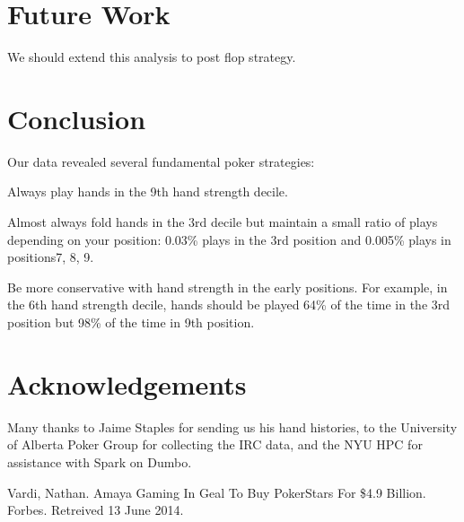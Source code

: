 \documentclass[twoside]{article}
\begin{document}
\begin{multicols}{2}

\section{Future Work}

We should extend this analysis to post flop strategy. 


\section{Conclusion}

Our data revealed several fundamental poker strategies:
\begin{compactitem}
\item{} Always play hands in the 9th hand strength decile. 
\item{} Almost always fold hands in the 3rd decile but maintain a small ratio of plays depending on your position: 0.03\% plays in the 3rd position and 0.005\% plays in positions7, 8, 9. 
\item{}Be more conservative with hand strength in the early positions. For example, in the 6th hand strength decile, hands should be played 64\% of the time in the 3rd position but 98\% of the time in 9th position.
\end{compactitem}



\section{Acknowledgements}

Many thanks to Jaime Staples for sending us his hand histories, to the University of Alberta Poker Group for collecting the IRC data, and the NYU HPC for assistance with Spark on Dumbo. 



\begin{thebibliography}{99} %

 Vardi, Nathan. Amaya Gaming In Geal To Buy PokerStars For \$4.9 Billion. Forbes. Retreived 13 June 2014. 


\end{thebibliography}
\end{multicols}
\end{document}
